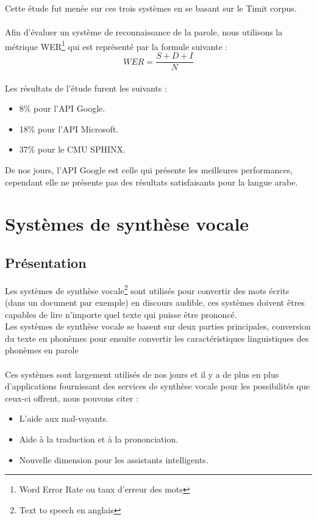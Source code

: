 Cette étude fut menée sur ces trois systèmes en se basant sur le Timit corpus\cite{timit}.
\\ \\ Afin d'évaluer un système de reconnaissance de la parole, nous utilisons la métrique WER\footnote{Word Error Rate ou taux d'erreur des mots} qui est représenté par la formule suivante\cite{werformula} : \\
\begin{equation}
    WER = \frac{S + D + I}{N}
\end{equation}
\\    
Les résultats de l'étude furent les suivants : 
\begin{itemize}
    \item 8\% pour l'API Google.
    \item 18\% pour l'API Microsoft.
    \item 37\% pour le CMU SPHINX.
\end{itemize}
De nos jours, l'API Google est celle qui présente les meilleures performances, cependant elle ne présente pas des résultats satisfaisants pour la langue arabe.

\newpage
\section{Systèmes de synthèse vocale}
\subsection{Présentation}
Les systèmes de synthèse vocale\footnote{Text to speech en anglais} sont utilisés pour convertir des mots écrits (dans un document par exemple) en discours audible, ces systèmes doivent êtres capables de lire n'importe quel texte qui puisse être prononcé.\\
Les systèmes de synthèse vocale se basent sur deux parties principales, conversion du texte en phonèmes pour ensuite convertir les caractéristiques linguistiques des phonèmes en parole\cite{textspeechpres}
\\ \\
Ces systèmes sont largement utilisés de nos jours et il y a de plus en plus d'applications fournissant des services de synthèse vocale pour les possibilités que ceux-ci offrent, nous pouvons citer : 
\begin{itemize}
    \item L’aide aux mal-voyants.
    \item Aide à la traduction et à la prononciation.
    \item Nouvelle dimension pour les assistants intelligents.
\end{itemize}

